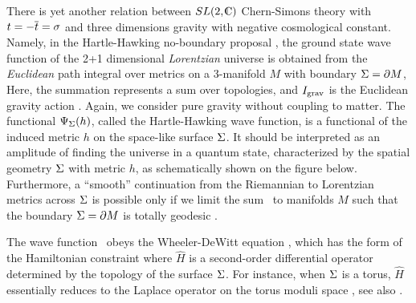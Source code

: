 There is yet another relation between $SL(2,\IC)$ Chern-Simons
theory with $t = - \overline t = \sigma$ and three dimensions gravity
with negative cosmological constant.
Namely, in the Hartle-Hawking no-boundary proposal \HartleH,
the ground state wave function of the 2+1 dimensional
{\it Lorentzian} universe is obtained from the {\it Euclidean} path
integral over metrics on a 3-manifold $M$ with boundary ${\Sigma}=\partial M$,
%
\eqn{}
%
Here, the summation represents a sum over topologies,
and $I_{{\rm grav}}$ is the Euclidean gravity action \igrav.
Again, we consider pure gravity without coupling to matter.
The functional $\Psi_{{\Sigma}}(h)$, called the Hartle-Hawking wave function,
is a functional of the induced metric $h$ on the space-like surface ${\Sigma}$.
It should be interpreted as an amplitude of finding the universe
in a quantum state, characterized by the spatial geometry ${\Sigma}$
with metric $h$, as schematically shown on the figure below.
Furthermore, a ``smooth'' continuation from
the Riemannian to Lorentzian metrics across ${\Sigma}$
is possible only if we limit the sum \hhpsi\ to manifolds $M$
such that the boundary ${\Sigma}=\partial M$ is totally geodesic \GHartle.

\ifig{}
{}

The wave function \hhpsi\ obeys the Wheeler-DeWitt equation \WDW,
which has the form of the Hamiltonian constraint
%
\eqn{}
%
where $\hat H$ is a second-order differential operator
determined by the topology of the surface ${\Sigma}$.
For instance, when ${\Sigma}$ is a torus, $\hat H$ essentially
reduces to the Laplace operator on the torus moduli space \CarlipWDW,
see also .

